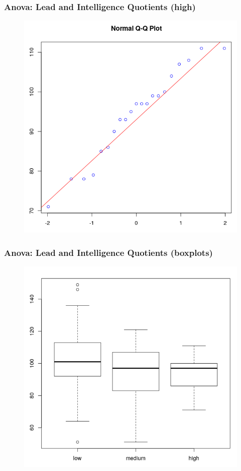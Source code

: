 \documentclass[xcolor=dvipsnames]{beamer}
\begin{document}
\begin{frame}
  \frametitle{Anova: Lead and Intelligence Quotients (high)}
  \begin{figure}[h]
    \includegraphics[scale=0.35]{./diagrams/lead_h.png}
  \end{figure}
\end{frame}

\begin{frame}
  \frametitle{Anova: Lead and Intelligence Quotients (boxplots)}
\begin{figure}[h]
  \includegraphics[scale=0.35]{./diagrams/lead_bp.png}
\end{figure}
\end{frame}
\end{document}
